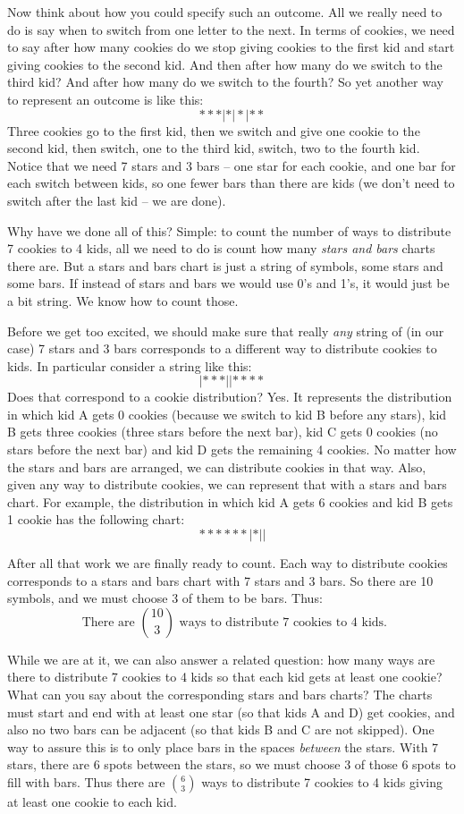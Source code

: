 \documentclass[12pt]{article}
\begin{document}
Now think about how you could specify such an outcome.  All we really need to do is say when to switch from one letter to the next. In terms of cookies, we need to say after how many cookies do we stop giving cookies to the first kid and start giving cookies to the second kid.  And then after how many do we switch to the third kid?  And after how many do we switch to the fourth?  So yet another way to represent an outcome is like this:
\[***|*|*|**\]
Three cookies go to the first kid, then we switch and give one cookie to the second kid, then switch, one to the third kid, switch, two to the fourth kid.  Notice that we need 7 stars and 3 bars -- one star for each cookie, and one bar for each switch between kids, so one fewer bars than there are kids (we don't need to switch after the last kid -- we are done).

Why have we done all of this?  Simple: to count the number of ways to distribute 7 cookies to 4 kids, all we need to do is count how many {\em stars and bars} charts there are.  But a stars and bars chart is just a string of symbols, some stars and some bars.  If instead of stars and bars we would use 0's and 1's, it would just be a bit string.  We know how to count those.

Before we get too excited, we should make sure that really {\em any} string of (in our case) 7 stars and 3 bars corresponds to a different way to distribute cookies to kids.  In particular consider a string like this:
\[|***||****\]
Does that correspond to a cookie distribution?  Yes.  It represents the distribution in which kid A gets 0 cookies (because we switch to kid B before any stars), kid B gets three cookies (three stars before the next bar), kid C gets 0 cookies (no stars before the next bar) and kid D gets the remaining 4 cookies.  No matter how the stars and bars are arranged, we can distribute cookies in that way.  Also, given any way to distribute cookies, we can represent that with a stars and bars chart.  For example, the distribution in which kid A gets 6 cookies and kid B gets 1 cookie has the following chart:
\[******|*||\]

After all that work we are finally ready to count.  Each way to distribute cookies corresponds to a stars and bars chart with 7 stars and 3 bars.  So there are 10 symbols, and we must choose 3 of them to be bars.  Thus:
\[\mbox{ There are }{10 \choose 3}\mbox{ ways to distribute 7 cookies to 4 kids.}\]

While we are at it, we can also answer a related question: how many ways are there to distribute 7 cookies to 4 kids so that each kid gets at least one cookie?  What can you say about the corresponding stars and bars charts?  The charts must start and end with at least one star (so that kids A and D) get cookies, and also no two bars can be adjacent (so that kids B and C are not skipped).  One way to assure this is to only place bars in the spaces \emph{between} the stars.  With 7 stars, there are 6 spots between the stars, so we must choose 3 of those 6 spots to fill with bars.  Thus there are ${6 \choose 3}$ ways to distribute 7 cookies to 4 kids giving at least one cookie to each kid.
\end{document}
